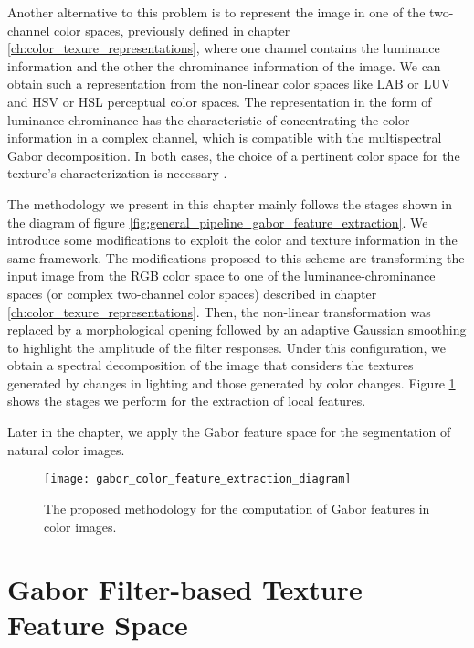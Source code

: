 Another alternative to this problem is to represent the image in one of the two-channel color spaces, previously defined in chapter \ref{ch:color_texure_representations}, where one channel contains the luminance information and the other the chrominance information of the image. We can obtain such a representation from the non-linear color spaces like LAB or LUV and HSV or HSL perceptual color spaces. The representation in the form of luminance-chrominance has the characteristic of concentrating the color information in a complex channel, which is compatible with the multispectral Gabor decomposition. In both cases, the choice of a pertinent color space for the texture's characterization is necessary \citep{Qazi.Alata.ea:PR:2011}.

The methodology we present in this chapter mainly follows the stages shown in the diagram of figure \ref{fig:general_pipeline_gabor_feature_extraction}. We introduce some modifications to exploit the color and texture information in the same framework. The modifications proposed to this scheme are transforming the input image from the RGB color space to one of the luminance-chrominance spaces (or complex two-channel color spaces) described in chapter \ref{ch:color_texure_representations}. Then, the non-linear transformation was replaced by a morphological opening followed by an adaptive Gaussian smoothing to highlight the amplitude of the filter responses. Under this configuration, we obtain a spectral decomposition of the image that considers the textures generated by changes in lighting and those generated by color changes. Figure \ref{fig:proposed_pipeline_gabor_feature_extraction} shows the stages we perform for the extraction of local features.

Later in the chapter, we apply the Gabor feature space for the segmentation of natural color images. 

\begin{figure}[!ht]
	\centering
	\texttt{[image: gabor\_color\_feature\_extraction\_diagram]}
	\caption{The proposed methodology for the computation of Gabor features in color images.}\label{fig:proposed_pipeline_gabor_feature_extraction}
\end{figure}

\section{Gabor Filter-based Texture Feature Space}

